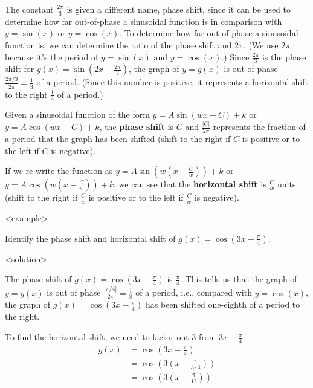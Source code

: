       The constant $\frac{2\pi}{3}$ is given a different name, phase shift, since it can be used to determine how far out-of-phase a sinusoidal function is in comparison with $y=\sin(x)$ or $y=\cos(x)$. To determine how far out-of-phase a sinusoidal function is, we can determine the ratio of the phase shift and $2\pi$. (We use $2\pi$ because it's the period of $y=\sin(x)$ and $y=\cos(x)$.)  Since $\frac{2\pi}{3}$ is the phase shift for $g(x)=\sin \left( 2x-\frac{2\pi}{3} \right)$, the graph of $y=g(x)$ is out-of-phase $\frac{2\pi/3}{2\pi}=\frac{1}{3}$ of a period. (Since this number is positive, it represents a horizontal shift to the right $\frac{1}{3}$ of a period.)
    

    \begin{myDefinition}
          Given a sinusoidal function of the form $y=A\sin(wx-C)+k$ or $y=A\cos(wx-C)+k$, the \textbf{phase shift} is $C$ and $\frac{|C|}{2\pi}$ represents the fraction of a period that the graph has been shifted (shift to the right if $C$ is positive or to the left if $C$ is negative).
    \end{myDefinition}
    \begin{myDefinition}
          If we re-write the function as $y=A\sin \left( w \left( x-\frac{C}{w}\right)\right)+k$ or $y=A\cos  \left( w \left( x-\frac{C}{w}\right)\right)+k$, we can see that the \textbf{horizontal shift} is $\frac{C}{w}$ units (shift to the right if $\frac{C}{w}$ is positive or to the left if $\frac{C}{w}$ is negative).
    \end{myDefinition}
    <example>
        
          Identify the phase shift and horizontal shift of $g(x)=\cos \left( 3x-\frac{\pi}{4} \right)$.
        
      <solution>
        
          The phase shift of $g(x)=\cos \left( 3x-\frac{\pi}{4} \right)$ is $\frac{\pi}{4}$. This tells us that the graph of $y=g(x)$ is out of phase $\frac{|\pi/4|}{2\pi}=\frac{1}{8}$ of a period, i.e., compared with $y=\cos(x)$, the graph of $g(x)=\cos(3x-\frac{\pi}{4})$ has been shifted one-eighth of a period to the right.
        
        
          To find the horizontal shift, we need to factor-out $3$ from $3x-\frac{\pi}{4}$.
            \begin{align*}
              g(x) &=\cos\left( 3x-\frac{\pi}{4}\right)\\
               &=\cos\left(3\left(x-\frac{\pi}{3 \cdot 4}\right)\right)\\
               &=\cos\left(3\left(x-\frac{\pi}{12}\right)\right)\\
            \end{align*}
        
